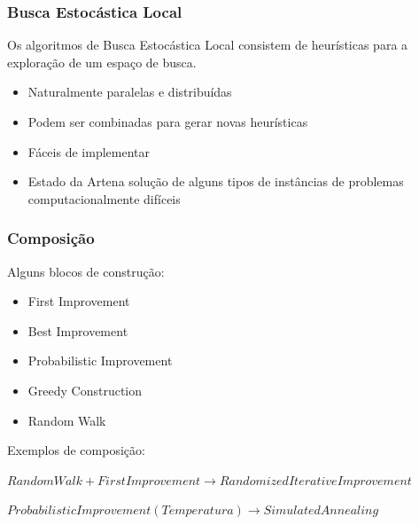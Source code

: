 \documentclass[10pt, compress]{beamer}
\begin{document}
\begin{frame}[fragile]
\begin{columns}
\begin{figure}[h]
        \end{figure}
    \end{columns}
    \let\thefootnote\relax{}
\end{frame}

\begin{frame}[fragile]
    \frametitle{Busca Estocástica Local}
    Os algoritmos de Busca Estocástica Local consistem de
    \alert{heurísticas} para a exploração de um espaço de busca.
    \pause
    \begin{itemize}
        \item Naturalmente \alert{paralelas} e \alert{distribuídas}
        \item Podem ser \alert{combinadas} para gerar novas heurísticas
            \pause
        \item \alert{Fáceis} de implementar
        \item \alert{Estado da Arte}\footnotemark[1]\footnotemark[2] na solução
            de \alert{alguns tipos} de instâncias de problemas computacionalmente
            difíceis
    \end{itemize}
\end{frame}

\begin{frame}[fragile]
    \frametitle{Composição}
    Alguns \alert{blocos de construção}:
    \begin{itemize}
        \item First Improvement
        \item Best Improvement
        \item Probabilistic Improvement
        \item Greedy Construction
        \item Random Walk
    \end{itemize}
            \pause
    Exemplos de \alert{composição}:

    \small{$RandomWalk + FirstImprovement \rightarrow RandomizedIterativeImprovement$}
    \pause

    \small{$ProbabilisticImprovement(Temperatura) \rightarrow SimulatedAnnealing$}
\end{frame}
\end{document}
